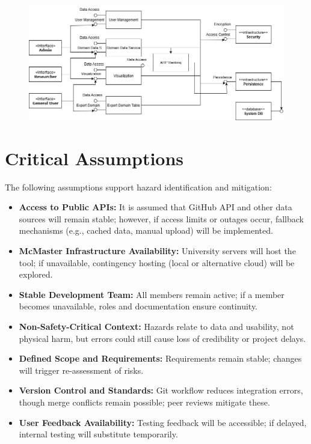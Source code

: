 \documentclass{article}
\begin{document}
\begin{figure}[H]
    \centering
    \includegraphics[scale=0.5] {component.png}
\end{figure}

\section{Critical Assumptions}

The following assumptions support hazard identification and mitigation:

\begin{itemize}
    \item \textbf{Access to Public APIs:} It is assumed that GitHub API and other
    data sources will remain stable; however, if access limits or outages occur,
    fallback mechanisms (e.g., cached data, manual upload) will be implemented.
    
    \item \textbf{McMaster Infrastructure Availability:} University servers will
    host the tool; if unavailable, contingency hosting (local or alternative
    cloud) will be explored.
    
    \item \textbf{Stable Development Team:} All members remain active; if a
    member becomes unavailable, roles and documentation ensure continuity.
    
    \item \textbf{Non-Safety-Critical Context:} Hazards relate to data and
    usability, not physical harm, but errors could still cause loss of
    credibility or project delays.
    
    \item \textbf{Defined Scope and Requirements:} Requirements remain stable;
    changes will trigger re-assessment of risks.
    
    \item \textbf{Version Control and Standards:} Git workflow reduces
    integration errors, though merge conflicts remain possible; peer reviews
    mitigate these.
    
    \item \textbf{User Feedback Availability:} Testing feedback will be
    accessible; if delayed, internal testing will substitute temporarily.
\end{itemize}
\end{document}
